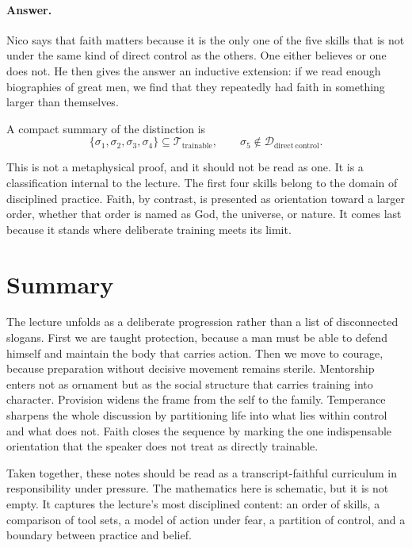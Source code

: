\paragraph{Answer.} Nico says that faith matters because it is the only one of the five skills that is not under the same kind of direct control as the others. One either believes or one does not. He then gives the answer an inductive extension: if we read enough biographies of great men, we find that they repeatedly had faith in something larger than themselves.

A compact summary of the distinction is
\begin{equation}
\{\sigma_1,\sigma_2,\sigma_3,\sigma_4\}\subseteq \mathcal{T}_{\mathrm{trainable}},
\qquad
\sigma_5\notin \mathcal{D}_{\mathrm{direct\ control}}.
\end{equation}

This is not a metaphysical proof, and it should not be read as one. It is a classification internal to the lecture. The first four skills belong to the domain of disciplined practice. Faith, by contrast, is presented as orientation toward a larger order, whether that order is named as God, the universe, or nature. It comes last because it stands where deliberate training meets its limit.

\section{Summary}

The lecture unfolds as a deliberate progression rather than a list of disconnected slogans. First we are taught protection, because a man must be able to defend himself and maintain the body that carries action. Then we move to courage, because preparation without decisive movement remains sterile. Mentorship enters not as ornament but as the social structure that carries training into character. Provision widens the frame from the self to the family. Temperance sharpens the whole discussion by partitioning life into what lies within control and what does not. Faith closes the sequence by marking the one indispensable orientation that the speaker does not treat as directly trainable.

Taken together, these notes should be read as a transcript-faithful curriculum in responsibility under pressure. The mathematics here is schematic, but it is not empty. It captures the lecture's most disciplined content: an order of skills, a comparison of tool sets, a model of action under fear, a partition of control, and a boundary between practice and belief.